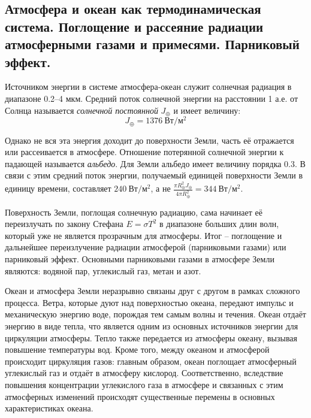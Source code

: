 \subsection{Атмосфера и океан как термодинамическая система. Поглощение и рассеяние радиации атмосферными газами и примесями. Парниковый эффект.}\label{q5-1}
Источником энергии в системе атмосфера-океан служит солнечная радиация в диапазоне 0.2--4 мкм.
Средний поток солнечной энергии на расстоянии 1 а.е. от Солнца называется \textit{солнечной постоянной} $J_\oplus$ и имеет величину:
\begin{equation}
J_\oplus=1376\:\text{Вт}/\text{м}^2
\end{equation}

Однако не вся эта энергия доходит до поверхности Земли, часть её отражается или рассеивается в атмосфере.
Отношение потерянной солнечной энергии к падающей называется \textit{альбедо}.
Для Земли альбедо имеет величину порядка 0.3.
В связи с этим средний поток энергии, получаемый единицей поверхности Земли в единицу времени, составляет $240\:\text{Вт}/\text{м}^2$, а не $\frac{\pi R_\oplus^2 J_\oplus}{4\pi R_\oplus^2}=344\:\text{Вт}/\text{м}^2$.

Поверхность Земли, поглощая солнечную радиацию, сама начинает её переизлучать по закону Стефана $E=\sigma T^2$ в диапазоне больших длин волн, который уже не является прозрачным для атмосферы.
Итог -- поглощение и дальнейшее переизлучение радиации атмосферой (парниковыми газами) или парниковый эффект.
Основными парниковыми газами в атмосфере Земли являются: водяной пар, углекислый газ, метан и азот.

Океан и атмосфера Земли неразрывно связаны друг с другом в рамках сложного процесса.
Ветра, которые дуют над поверхностью океана, передают импульс и механическую энергию воде, порождая тем самым волны и течения.
Океан отдаёт энергию в виде тепла, что является одним из основных источников энергии для циркуляции атмосферы.
Тепло также передается из атмосферы океану, вызывая повышение температуры вод.
Кроме того, между океаном и атмосферой происходит циркуляция газов: главным образом, океан поглощает атмосферный углекислый газ и отдаёт в атмосферу кислород.
Соответственно, вследствие повышения концентрации углекислого газа в атмосфере и связанных с этим атмосферных изменений происходят существенные перемены в основных характеристиках океана.

